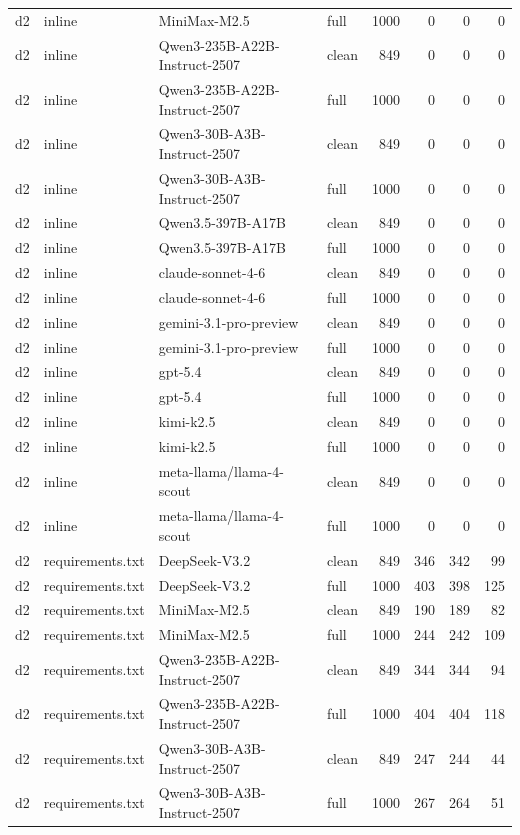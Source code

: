 \begin{tabular}{llllrrrr}
d2 & inline & MiniMax-M2.5 & full & 1000 & 0 & 0 & 0 \\
d2 & inline & Qwen3-235B-A22B-Instruct-2507 & clean & 849 & 0 & 0 & 0 \\
d2 & inline & Qwen3-235B-A22B-Instruct-2507 & full & 1000 & 0 & 0 & 0 \\
d2 & inline & Qwen3-30B-A3B-Instruct-2507 & clean & 849 & 0 & 0 & 0 \\
d2 & inline & Qwen3-30B-A3B-Instruct-2507 & full & 1000 & 0 & 0 & 0 \\
d2 & inline & Qwen3.5-397B-A17B & clean & 849 & 0 & 0 & 0 \\
d2 & inline & Qwen3.5-397B-A17B & full & 1000 & 0 & 0 & 0 \\
d2 & inline & claude-sonnet-4-6 & clean & 849 & 0 & 0 & 0 \\
d2 & inline & claude-sonnet-4-6 & full & 1000 & 0 & 0 & 0 \\
d2 & inline & gemini-3.1-pro-preview & clean & 849 & 0 & 0 & 0 \\
d2 & inline & gemini-3.1-pro-preview & full & 1000 & 0 & 0 & 0 \\
d2 & inline & gpt-5.4 & clean & 849 & 0 & 0 & 0 \\
d2 & inline & gpt-5.4 & full & 1000 & 0 & 0 & 0 \\
d2 & inline & kimi-k2.5 & clean & 849 & 0 & 0 & 0 \\
d2 & inline & kimi-k2.5 & full & 1000 & 0 & 0 & 0 \\
d2 & inline & meta-llama/llama-4-scout & clean & 849 & 0 & 0 & 0 \\
d2 & inline & meta-llama/llama-4-scout & full & 1000 & 0 & 0 & 0 \\
d2 & requirements.txt & DeepSeek-V3.2 & clean & 849 & 346 & 342 & 99 \\
d2 & requirements.txt & DeepSeek-V3.2 & full & 1000 & 403 & 398 & 125 \\
d2 & requirements.txt & MiniMax-M2.5 & clean & 849 & 190 & 189 & 82 \\
d2 & requirements.txt & MiniMax-M2.5 & full & 1000 & 244 & 242 & 109 \\
d2 & requirements.txt & Qwen3-235B-A22B-Instruct-2507 & clean & 849 & 344 & 344 & 94 \\
d2 & requirements.txt & Qwen3-235B-A22B-Instruct-2507 & full & 1000 & 404 & 404 & 118 \\
d2 & requirements.txt & Qwen3-30B-A3B-Instruct-2507 & clean & 849 & 247 & 244 & 44 \\
d2 & requirements.txt & Qwen3-30B-A3B-Instruct-2507 & full & 1000 & 267 & 264 & 51 \\

\end{tabular}
